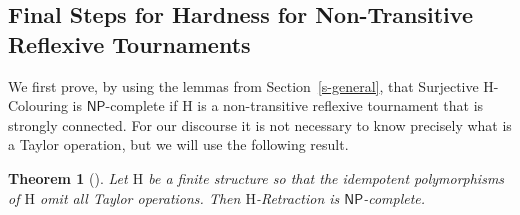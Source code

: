 \documentclass[a4paper,12pt]{article}
\newtheorem{theorem}{Theorem}
\theoremstyle{remark}
\newcommand{\NP}[0]{\ensuremath{\mathsf{NP}}}
\renewcommand{\H}{\ensuremath{\mathrm{H}}}
\begin{document}
\subsection{Final Steps for Hardness for Non-Transitive Reflexive Tournaments}

We first prove, by using the lemmas from Section~\ref{s-general}, that {\sc Surjective $\H$-Colouring} is \NP-complete if $\H$ is a non-transitive reflexive tournament that is strongly connected.
For our discourse it is not necessary to know precisely what is a Taylor operation, but we will use the following result.

\begin{theorem}[\cite{JBK,Larose2005}]
Let $\H$ be a finite structure so that the idempotent polymorphisms of $\H$ omit all Taylor operations. Then 
{\sc $\H$-Retraction} is \NP-complete.
\label{thm:ret-hardness}
\end{theorem}
\end{document}
